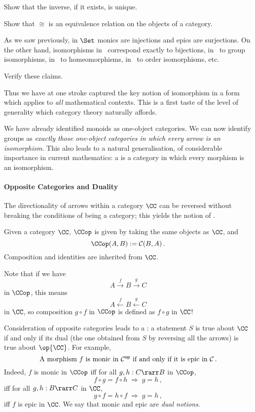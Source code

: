 \documentclass{svmult}
\begin{document}
\begin{myexercise}
Show that the inverse, if it exists, is unique.
\end{myexercise}
\begin{myexercise}
Show that $\cong$ is an equivalence relation on the objects of a category.
\end{myexercise}
As we saw previously, in $\Set$ monics are injections and epics are surjections. On the other hand, isomorphisms in \Set\ correspond exactly to bijections, in \Grp\
to group isomorphisms, in \Top\ to homeomorphisms, in \Pos\ to order isomorphisms, etc.
\begin{myexercise}
Verify these claims.
\end{myexercise}
Thus we have at one stroke captured the key notion of isomorphism in a form which applies
to \emph{all} mathematical contexts. This is a first taste of the level of generality which category theory naturally affords.

We have already identified monoids as one-object categories. We can now identify groups as \emph{exactly those one-object categories in which every arrow is an isomorphism}. This also leads to a natural generalisation, of considerable importance in current mathematics: a  is a category in which every morphism is an isomorphism.

\paragraph{Opposite Categories and Duality}
The directionality of arrows within a category $\CC$ can be reversed without breaking the conditions of being a category; this yields the notion of .

\begin{mydefinition}
Given a category $\CC$,  $\CCop$ is given by taking the same objects as $\CC$, and
\[ \CCop(A, B) := \mathcal{C}(B, A)\,. \]
Composition and identities are inherited from $\CC$. \deq
\end{mydefinition}
%
Note that if we have
\[ A \stackrel{f}{\longrightarrow} B \stackrel{g}{\longrightarrow} C
\]
in $\CCop$, this means
\[ A \stackrel{f}{\longleftarrow} B \stackrel{g}{\longleftarrow} C \]
in $\CC$, so composition  $g \circ f$ in $\CCop$ is defined as $f \circ g$ in $\CC$!

Consideration of opposite categories leads to a : a statement $S$ is true about $\CC$ if and only if its dual (\ie the one
obtained from $S$ by reversing all the arrows) is true about $\op{\CC}$. For example,
\[ \text{A morphism $f$ is {monic} in $\mathcal{C}^{\mathsf{op}}$ if and only if it is {epic} in $\mathcal{C}$\,.} \]
Indeed, $f$ is monic in $\CCop$ iff for all $g, h : C \rarr B$ in $\CCop$,
\[ f \circ g = f \circ h \; \Longrightarrow \; g = h\,, \]
iff for all $g, h : B \rarr C$ in $\CC$,
\[ g \circ f = h \circ f \; \Longrightarrow \; g = h\,, \]
iff $f$ is epic in $\CC$. We say that monic and epic are \emph{dual notions}.
\end{document}
